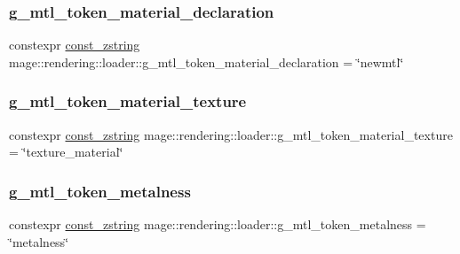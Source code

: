 \subsubsection{\texorpdfstring{g\+\_\+mtl\+\_\+token\+\_\+material\+\_\+declaration}{g\_mtl\_token\_material\_declaration}}
{\footnotesize\ttfamily constexpr \mbox{\hyperlink{namespacemage_abfd9206dc607ceb5d13ec68bf075a5c0}{const\+\_\+zstring}} mage\+::rendering\+::loader\+::g\+\_\+mtl\+\_\+token\+\_\+material\+\_\+declaration = \char`\"{}newmtl\char`\"{}}

\mbox{\label{namespacemage_1_1rendering_1_1loader_a0bd068f0f246c00b56412b1bd7f70ed4}} 
\subsubsection{\texorpdfstring{g\+\_\+mtl\+\_\+token\+\_\+material\+\_\+texture}{g\_mtl\_token\_material\_texture}}
{\footnotesize\ttfamily constexpr \mbox{\hyperlink{namespacemage_abfd9206dc607ceb5d13ec68bf075a5c0}{const\+\_\+zstring}} mage\+::rendering\+::loader\+::g\+\_\+mtl\+\_\+token\+\_\+material\+\_\+texture = \char`\"{}texture\+\_\+material\char`\"{}}

\mbox{\label{namespacemage_1_1rendering_1_1loader_a17bfd9071437318629c792d38ca71808}} 
\subsubsection{\texorpdfstring{g\+\_\+mtl\+\_\+token\+\_\+metalness}{g\_mtl\_token\_metalness}}
{\footnotesize\ttfamily constexpr \mbox{\hyperlink{namespacemage_abfd9206dc607ceb5d13ec68bf075a5c0}{const\+\_\+zstring}} mage\+::rendering\+::loader\+::g\+\_\+mtl\+\_\+token\+\_\+metalness = \char`\"{}metalness\char`\"{}}

